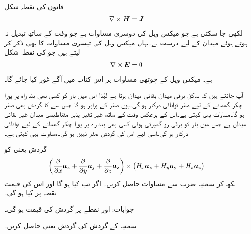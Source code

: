  قانون کی نقطہ شکل
\begin{align}\label{مساوات-مقناطیسی_مقناطیسی_گردش_صفر}
\nabla \times {\ensuremath{{\boldsymbol{H}}}}={{\boldsymbol{J}}}
\end{align}
لکھی جا سکتی ہے جو  میکس ویل کی دوسری مساوات ہے جو وقت کے ساتھ تبدیل نہ ہوتے ہوئے میدان کے لیے درست ہے۔یہاں میکس ویل کی تیسری مساوات کا بھی ذکر کر لیتے ہیں جو  کی نقطہ شکل
\begin{align}\label{مساوات-مقناطیسی_برقی_گردش_صفر}
\nabla \times {\ensuremath{{\boldsymbol{E}}}}=0
\end{align}
ہے۔ میکس ویل کے چوتھی مساوات پر اس کتاب میں آگے غور کیا جائے گا۔

آپ جانتے ہیں کہ ساکن برقی میدان  بقائی میدان ہوتا ہے لہٰذا اس میں بار  کو کسی بھی بند راہ پر پورا چکر گھمانے کے لیے صفر توانائی درکار ہو گی۔یوں  صفر کے برابر ہو گا جس سے  کا گردش بھی صفر ہو گا۔مساوات  یہی کہتی ہے۔اس کے برعکس وقت کے ساتھ غیر تغیر پذیر مقناطیسی میدان غیر بقائی میدان ہے جس میں بار کو برقی رو گھیرتی ہوئی کسی بھی بند راہ پر پورا چکر گھمانے کے لیے توانائی درکار ہو گی۔اسی لیے اس کی گردش صفر نہیں ہو گی۔مساوات  یہی کہتی ہے۔


گردش یعنی  کو
\begin{align*}
\left(\frac{\partial }{\partial x}{\boldsymbol{a}}_{\textup{x}}+\frac{\partial }{\partial y}{\boldsymbol{a}}_{\textup{y}}+\frac{\partial }{\partial z}{\boldsymbol{a}}_{\textup{z}} \right) \times \left(H_x {\boldsymbol{a}}_{\textup{x}}+H_y {\boldsymbol{a}}_{\textup{y}}+H_z {\boldsymbol{a}}_{\textup{z}} \right)
\end{align*}
لکھ کر سمتیہ ضرب سے مساوات  حاصل کریں۔
اگر  تب  کیا ہو گا اور اس کی قیمت نقطہ  پر کیا ہو گی۔

جوابات: اور نقطے پر گردش کی قیمت  ہو گی۔

سمتیہ  کے گردش کی گردش یعنی  حاصل کریں۔

